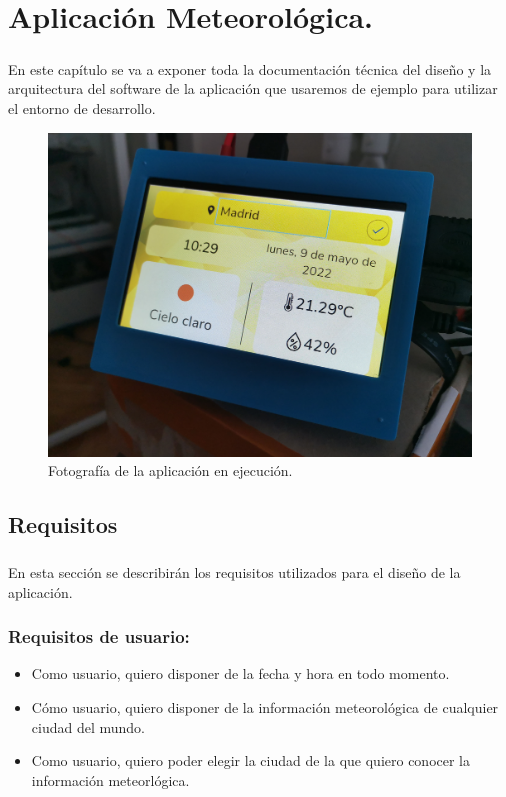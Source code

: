 \chapter{Aplicación Meteorológica.}\label{sec:AplicacionMeteorologica}

\paragraph{}En este capítulo se va a exponer toda la documentación técnica del diseño
y la arquitectura del software de la aplicación que usaremos de ejemplo para utilizar
el entorno de desarrollo.

\begin{figure}[H]
	\centering
	\includegraphics[width=0.9\linewidth]{imgs/app1}
	\caption[Portada de la app]{Fotografía de la aplicación en ejecución.}
	\label{img:rpi-weather-portada}
\end{figure}

\section{Requisitos}

\paragraph{}En esta sección se describirán los requisitos utilizados para el diseño
de la aplicación.

\subsection{Requisitos de usuario:}
\begin{itemize}
    \item Como usuario, quiero disponer de la fecha y hora en todo momento.
    \item Cómo usuario, quiero disponer de la información meteorológica de cualquier
    ciudad del mundo.
    \item Como usuario, quiero poder elegir la ciudad de la que quiero conocer la
    información meteorlógica.
\end{itemize}

